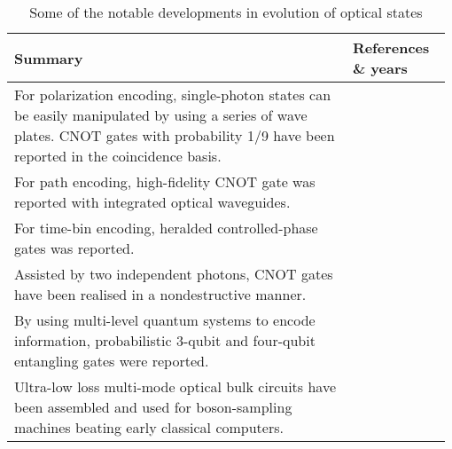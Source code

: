 \begin{table*}[!htbp]
	\begin{tabular}{|p{0.755\linewidth}|p{0.22\linewidth}|}
		\hline \hline
		Summary & References \& years \\
		\hline \hline
		For polarization encoding, single-photon states can be easily manipulated by using a series of wave plates. CNOT gates with probability 1/9 have been reported in the coincidence basis. &  \cite{bib:Brien2003demonstration, bib:Kiesel2005, bib:Langford2005,  bib:Okamoto2005} \\
		\hline
		For path encoding, high-fidelity CNOT gate was reported with integrated optical waveguides. & \cite{bib:politi2008silica} \\
		\hline
		For time-bin encoding, heralded controlled-phase gates was reported. & \cite{bib:Humphreys2013} \\
		\hline
		Assisted by two independent photons, CNOT gates have been realised in a nondestructive manner. & \cite{bib:Bao2007Optical, bib:Zhao2005Experimental} \\
		\hline
		By using multi-level quantum systems to encode information, probabilistic 3-qubit and four-qubit entangling gates were reported. & \cite{bib:lanyon2009simplifying, bib:starek2016} \\
		\hline
		Ultra-low loss multi-mode optical bulk circuits have been assembled and used for boson-sampling machines beating early classical computers. & \cite{bib:wang2017high, bib:wang2018toward} \\
		\hline
	\end{tabular}
	\captionspacetab \caption{Some of the notable developments in evolution of optical states} \label{tab:evolutionofstates}
\end{table*}

